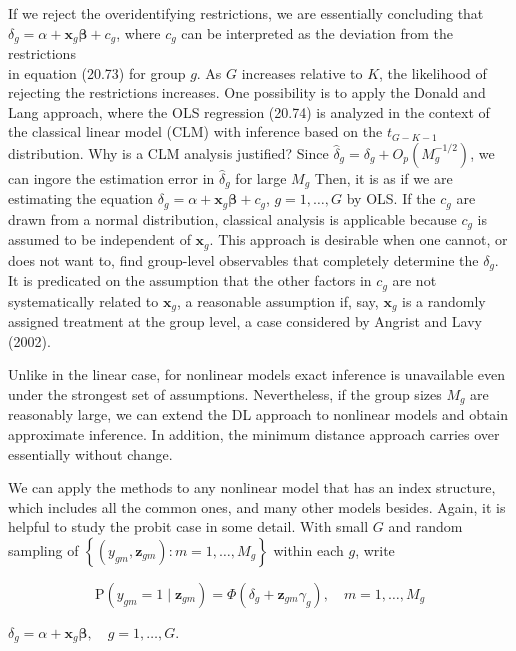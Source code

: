 \documentclass[10pt]{article}
\begin{document}
If we reject the overidentifying restrictions, we are essentially concluding that $\delta_{g}=\alpha+\mathbf{x}_{g} \boldsymbol{\beta}+c_{g}$, where $c_{g}$ can be interpreted as the deviation from the restrictions\\
in equation (20.73) for group $g$. As $G$ increases relative to $K$, the likelihood of rejecting the restrictions increases. One possibility is to apply the Donald and Lang approach, where the OLS regression (20.74) is analyzed in the context of the classical linear model (CLM) with inference based on the $t_{G-K-1}$ distribution. Why is a CLM analysis justified? Since $\hat{\delta}_{g}=\delta_{g}+O_{p}\left(M_{g}^{-1 / 2}\right)$, we can ingore the estimation error in $\hat{\delta}_{g}$ for large $M_{g}$ Then, it is as if we are estimating the equation $\delta_{g}=\alpha+\mathbf{x}_{g} \boldsymbol{\beta}+c_{g}$, $g=1, \ldots, G$ by OLS. If the $c_{g}$ are drawn from a normal distribution, classical analysis is applicable because $c_{g}$ is assumed to be independent of $\mathbf{x}_{g}$. This approach is desirable when one cannot, or does not want to, find group-level observables that completely determine the $\delta_{g}$. It is predicated on the assumption that the other factors in $c_{g}$ are not systematically related to $\mathbf{x}_{g}$, a reasonable assumption if, say, $\mathbf{x}_{g}$ is a randomly assigned treatment at the group level, a case considered by Angrist and Lavy (2002).

Unlike in the linear case, for nonlinear models exact inference is unavailable even under the strongest set of assumptions. Nevertheless, if the group sizes $M_{g}$ are reasonably large, we can extend the DL approach to nonlinear models and obtain approximate inference. In addition, the minimum distance approach carries over essentially without change.

We can apply the methods to any nonlinear model that has an index structure, which includes all the common ones, and many other models besides. Again, it is helpful to study the probit case in some detail. With small $G$ and random sampling of $\left\{\left(y_{g m}, \mathbf{z}_{g m}\right): m=1, \ldots, M_{g}\right\}$ within each $g$, write


\begin{equation*}
\mathrm{P}\left(y_{g m}=1 \mid \mathbf{z}_{g m}\right)=\Phi\left(\delta_{g}+\mathbf{z}_{g m} \gamma_{g}\right), \quad m=1, \ldots, M_{g} \tag{20.76}
\end{equation*}


$\delta_{g}=\alpha+\mathbf{x}_{g} \boldsymbol{\beta}, \quad g=1, \ldots, G$.
\end{document}
